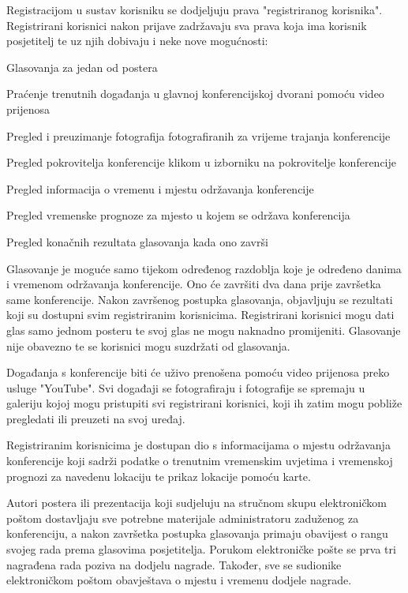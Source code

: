 		Registracijom u sustav korisniku se dodjeljuju prava "registriranog korisnika". 
		Registrirani korisnici nakon prijave zadržavaju sva prava koja ima korisnik posjetitelj te uz njih dobivaju i neke nove mogućnosti:
		\begin{packed_item}
			\item Glasovanja za jedan od postera
			\item Praćenje trenutnih događanja u glavnoj konferencijskoj dvorani pomoću video prijenosa
			\item Pregled i preuzimanje fotografija fotografiranih za vrijeme trajanja konferencije
			\item Pregled pokrovitelja konferencije klikom u izborniku na pokrovitelje konferencije
			\item Pregled informacija o vremenu i mjestu održavanja konferencije
			\item Pregled vremenske prognoze za mjesto u kojem se održava konferencija
			\item Pregled konačnih rezultata glasovanja kada ono završi
		\end{packed_item}
		
		Glasovanje je moguće samo tijekom određenog razdoblja koje je određeno danima i vremenom održavanja konferencije. Ono će završiti dva dana prije završetka same konferencije. Nakon završenog postupka glasovanja, objavljuju se rezultati koji su dostupni svim registriranim korisnicima. 
		Registrirani korisnici mogu dati glas samo jednom posteru te svoj glas ne mogu naknadno promijeniti. Glasovanje nije obavezno te se korisnici mogu suzdržati od glasovanja.  
		
		Događanja s konferencije biti će uživo prenošena pomoću video prijenosa preko usluge "YouTube". Svi događaji se fotografiraju i fotografije se spremaju u galeriju kojoj mogu pristupiti svi registrirani korisnici, koji ih zatim mogu pobliže pregledati ili preuzeti na svoj uređaj.
		
		Registriranim korisnicima je dostupan dio s informacijama o mjestu održavanja konferencije koji sadrži podatke o trenutnim vremenskim uvjetima i vremenskoj prognozi za navedenu lokaciju te prikaz lokacije pomoću karte.
		
		Autori postera ili prezentacija koji sudjeluju na stručnom skupu elektroničkom poštom dostavljaju sve potrebne materijale administratoru zaduženog za konferenciju, a nakon završetka postupka glasovanja primaju obavijest o rangu svojeg rada prema glasovima posjetitelja. Porukom elektroničke pošte se prva tri nagrađena rada poziva na dodjelu nagrade. Također, sve se sudionike elektroničkom poštom obavještava o mjestu i vremenu dodjele nagrade. 
		
